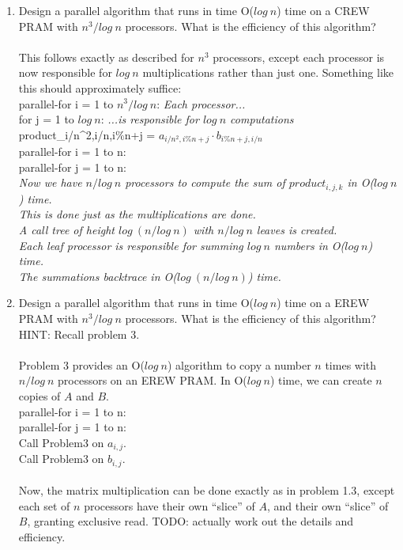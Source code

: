 \documentclass[10pt]{article}
\newcommand{\tab}{\hspace*{2em}}
\newcommand{\tabb}{\hspace*{4em}}
\begin{document}
\begin{enumerate}
\item Design a parallel algorithm that runs in time O($log~n$) time on a CREW PRAM with $n^3/log~n$
processors. What is the efficiency of this algorithm?\\
\\
This follows exactly as described for $n^3$ processors, except each processor is now responsible for
$log~n$ multiplications rather than just one. Something like this should approximately suffice:\\
parallel-for i = 1 to $n^3/log~n$: \emph{Each processor...}\\
\tab for j = 1 to $log~n$: \emph{...is responsible for $log~n$ computations}\\
\tabb product_{i/n^2,i/n,i\%{n}+j} = $a_{i/n^2,i\%{n}+j} \cdot b_{i\%{n}+j,i/n}$\\
parallel-for i = 1 to n:\\
\tab parallel-for j = 1 to n:\\
\tabb \emph{Now we have $n/log~n$ processors to compute the sum of $product_{i,j,k}$ in O($log~n$) time.}\\
\tabb \emph{This is done just as the multiplications are done.}\\
\tabb \emph{A call tree of height $log~(n/log~n)$ with $n/log~n$ leaves is created.}\\
\tabb \emph{Each leaf processor is responsible for summing $log~n$ numbers in O($log~n$) time.}\\
\tabb \emph{The summations backtrace in O($log~(n/log~n)$) time.}\\
            
\item Design a parallel algorithm that runs in time O($log~n$) time on a EREW PRAM with $n^3/log~n$
processors. What is the efficiency of this algorithm? HINT: Recall problem 3.\\
\\
Problem 3 provides an O($log~n$) algorithm to copy a number $n$ times with $n/log~n$ processors on an EREW PRAM.
In O($log~n$) time, we can create $n$ copies of $A$ and $B$.\\
parallel-for i = 1 to n:\\
\tab parallel-for j = 1 to n:\\
\tabb Call Problem3 on $a_{i,j}$.\\
\tabb Call Problem3 on $b_{i,j}$.\\
\\
Now, the matrix multiplication can be done exactly as in problem 1.3, except each set of $n$ processors have their
own ``slice'' of $A$, and their own ``slice'' of $B$, granting exclusive read.
TODO: actually work out the details and efficiency.
\end{enumerate}
\end{document}

